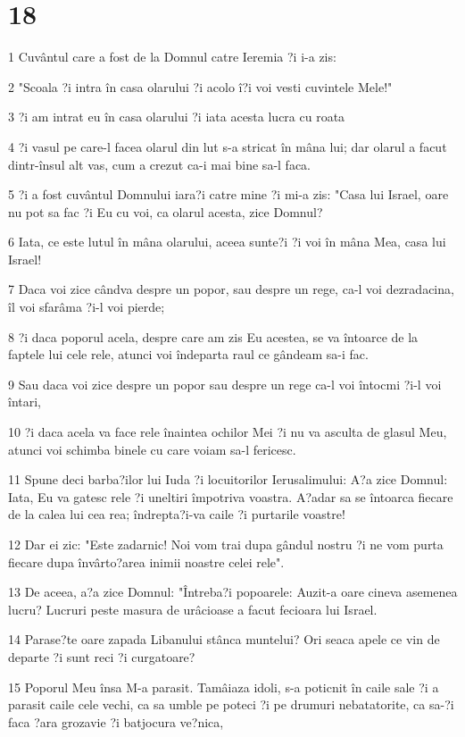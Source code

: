 \chapter{18}

\par 1 Cuvântul care a fost de la Domnul catre Ieremia ?i i-a zis:
\par 2 "Scoala ?i intra în casa olarului ?i acolo î?i voi vesti cuvintele Mele!"
\par 3 ?i am intrat eu în casa olarului ?i iata acesta lucra cu roata
\par 4 ?i vasul pe care-l facea olarul din lut s-a stricat în mâna lui; dar olarul a facut dintr-însul alt vas, cum a crezut ca-i mai bine sa-l faca.
\par 5 ?i a fost cuvântul Domnului iara?i catre mine ?i mi-a zis: "Casa lui Israel, oare nu pot sa fac ?i Eu cu voi, ca olarul acesta, zice Domnul?
\par 6 Iata, ce este lutul în mâna olarului, aceea sunte?i ?i voi în mâna Mea, casa lui Israel!
\par 7 Daca voi zice cândva despre un popor, sau despre un rege, ca-l voi dezradacina, îl voi sfarâma ?i-l voi pierde;
\par 8 ?i daca poporul acela, despre care am zis Eu acestea, se va întoarce de la faptele lui cele rele, atunci voi îndeparta raul ce gândeam sa-i fac.
\par 9 Sau daca voi zice despre un popor sau despre un rege ca-l voi întocmi ?i-l voi întari,
\par 10 ?i daca acela va face rele înaintea ochilor Mei ?i nu va asculta de glasul Meu, atunci voi schimba binele cu care voiam sa-l fericesc.
\par 11 Spune deci barba?ilor lui Iuda ?i locuitorilor Ierusalimului: A?a zice Domnul: Iata, Eu va gatesc rele ?i uneltiri împotriva voastra. A?adar sa se întoarca fiecare de la calea lui cea rea; îndrepta?i-va caile ?i purtarile voastre!
\par 12 Dar ei zic: "Este zadarnic! Noi vom trai dupa gândul nostru ?i ne vom purta fiecare dupa învârto?area inimii noastre celei rele".
\par 13 De aceea, a?a zice Domnul: "Întreba?i popoarele: Auzit-a oare cineva asemenea lucru? Lucruri peste masura de urâcioase a facut fecioara lui Israel.
\par 14 Parase?te oare zapada Libanului stânca muntelui? Ori seaca apele ce vin de departe ?i sunt reci ?i curgatoare?
\par 15 Poporul Meu însa M-a parasit. Tamâiaza idoli, s-a poticnit în caile sale ?i a parasit caile cele vechi, ca sa umble pe poteci ?i pe drumuri nebatatorite, ca sa-?i faca ?ara grozavie ?i batjocura ve?nica,
